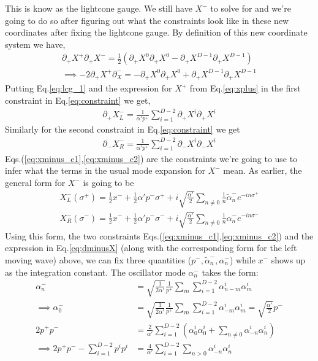 \documentclass{article}
\providecommand{\brak}[1]{\ensuremath{\left(#1\right)}} %
\begin{document}
This is know as the lightcone gauge. We still have $X^-$ to solve for and we're going to do so after figuring out what the constraints look like in these new coordinates after fixing the lightcone gauge. By definition of this new coordinate system we have,
\begin{align}
	\partial_+X^+\partial_+X^- = \frac{1}{2}\brak{\partial_+X^0\partial_+X^0-\partial_+X^{D-1}\partial_+X^{D-1}}\\
	\implies -2\partial_+X^+\partial_X^-= -\partial_+X^0\partial_+X^0+\partial_+X^{D-1}\partial_+X^{D-1}\label{eq:lcg_1}
\end{align}
Putting Eq.\eqref{eq:lcg_1} and the expression for $X^+$ from Eq.\eqref{eq:xplus} in the first constraint in Eq.\eqref{eq:constraint} we get,
\begin{align}
	\partial_+X_L^- = \frac{1}{\alpha'p^+}\sum_{i=1}^{D-2}\partial_+X^i\partial_+X^i\label{eq:xminus_c1}
\end{align}
Similarly for the second constraint in Eq.\eqref{eq:constraint} we get
\begin{align}
	\partial_-X_R^- = \frac{1}{\alpha'p^+}\sum_{i=1}^{D-2}\partial_-X^i\partial_-X^i \label{eq:xminus_c2}
\end{align}
Eqs.(\ref{eq:xminus_c1},\ref{eq:xminus_c2}) are the constraints we're going to use to infer what the terms in the usual mode expansion for $X^-$ mean. As earlier, the general form for $X^-$ is going to be 
\begin{align}
	X^-_L(\sigma^+) = \frac{1}{2}x^- +\frac{1}{2}\alpha'p^-\sigma^++i\sqrt{\frac{\alpha'}{2}}\sum_{n\neq0}\frac{1}{n}\tilde{\alpha}_n^-e^{-in\sigma^+}\\
	X^-_R(\sigma^-) = \frac{1}{2}x^- +\frac{1}{2}\alpha'p^-\sigma^-+i\sqrt{\frac{\alpha'}{2}}\sum_{n\neq0}\frac{1}{n}{\alpha}_n^-e^{-in\sigma^-}
\end{align}
Using this form, the two constraints Eqs.(\ref{eq:xminus_c1},\ref{eq:xminus_c2}) and the expression in Eq.\eqref{eq:dminusX} (along with the corresponding form for the left moving wave) above, we can fix three quantities ($p^-,\tilde{\alpha}_n^-,\alpha_n^-$) while $x^-$ shows up as the integration constant. The oscillator mode $\alpha_n^-$ takes the form:
\begin{align}
	\alpha_n^- &= \sqrt{\frac{1}{2\alpha'}}\frac{1}{p^+}\sum_m\sum_{i=1}^{D-2}\alpha^i_{n-m}\alpha_m^i\\
	\implies \alpha_0^- &=  \sqrt{\frac{1}{2\alpha'}}\frac{1}{p^+}\sum_m\sum_{i=1}^{D-2}\alpha^i_{-m}\alpha_m^i = \sqrt{\frac{\alpha'}{2}}p^-\label{eq:pminus_constraint}\\
	2p^+p^- &= \frac{2}{\alpha'}\sum_{i=1}^{D-2}\brak{\alpha_0^i\alpha_0^i +\sum_{n\neq0}\alpha_{-n}^i\alpha_{n}^i}\\
	\implies 2p^+p^--\sum_{i=1}^{D-2}p^ip^i &= \frac{4}{\alpha'}\sum_{i=1}^{D-2}\sum_{n>0}\alpha_{-n}^i\alpha_n^i\label{eq:pp_lc}
\end{align}
\end{document}
